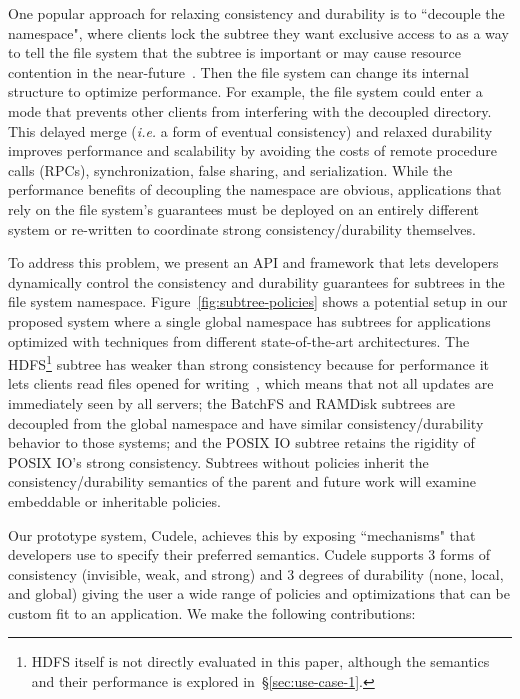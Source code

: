 One popular approach for relaxing consistency and durability is to ``decouple
the namespace", where clients lock the subtree they want exclusive access to as
a way to tell the file system that the subtree is important or may cause
resource contention in the near-future~\cite{grider:pdsw2015-marfs,
zheng:pdsw2015-deltafs, zheng:pdsw2014-batchfs, ren:sc2014-indexfs,
bent:slides-twotiers}. Then the file system can change its internal structure
to optimize performance. For example, the file system could enter a mode that
prevents other clients from interfering with the decoupled directory.  This
delayed merge ({\it i.e.} a form of eventual consistency) and relaxed
durability improves performance and scalability by avoiding the costs of remote
procedure calls (RPCs), synchronization, false sharing, and serialization.
While the performance benefits of decoupling the namespace are obvious,
applications that rely on the file system's guarantees must be deployed on an
entirely different system or re-written to coordinate strong
consistency/durability themselves.

To address this problem, we present an API and framework that lets developers
dynamically control the consistency and durability guarantees for subtrees in
the file system namespace.  Figure~\ref{fig:subtree-policies} shows a potential
setup in our proposed system where a single global namespace has subtrees for
applications optimized with techniques from different state-of-the-art
architectures.  The HDFS\footnote{HDFS itself is not directly evaluated in this
paper, although the semantics and their performance is explored
in~\S\ref{sec:use-case-1}.} subtree has weaker than strong consistency because
for performance it lets clients read files opened for
writing~\cite{hakimzadeh:dais14-hdfs-consistency}, which means that not all
updates are immediately seen by all servers; the BatchFS and RAMDisk subtrees
are decoupled from the global namespace and have similar consistency/durability
behavior to those systems; and the POSIX IO subtree retains the rigidity of
POSIX IO's strong consistency.  Subtrees without policies inherit the
consistency/durability semantics of the parent and future work will examine
embeddable or inheritable policies.

Our prototype system, Cudele, achieves this by exposing ``mechanisms" that
developers use to specify their preferred semantics.  Cudele supports 3 forms
of consistency (invisible, weak, and strong) and 3 degrees of durability (none,
local, and global) giving the user a wide range of policies and optimizations
that can be custom fit to an application. We make the following contributions:

